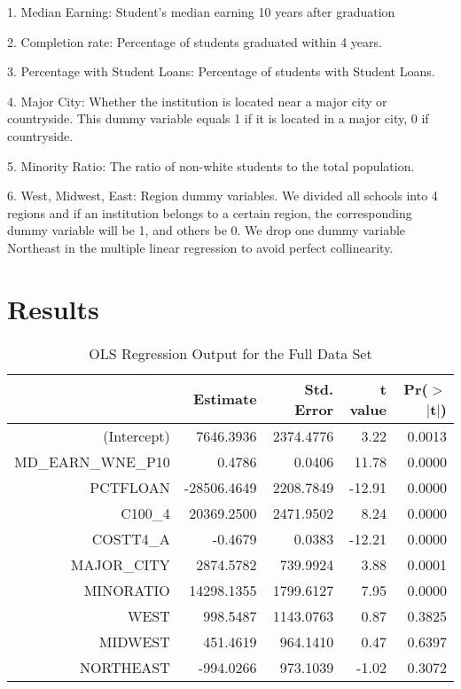 \documentclass{article}
\begin{document}
1. Median Earning: Student's median earning 10 years after graduation

2. Completion rate: Percentage of students graduated within 4 years.

3. Percentage with Student Loans: Percentage of students with Student Loans.

4. Major City: Whether the institution is located near a major city or countryside. This dummy variable equals 1 if it is located in a major city, 0 if countryside.

5. Minority Ratio: The ratio of non-white students to the total population.

6. West, Midwest, East: Region dummy variables. We divided all schools into 4 regions and if an institution belongs to a certain region, the corresponding dummy variable will be 1, and others be 0. We drop one dummy variable Northeast in the multiple linear regression to avoid perfect collinearity.

\section{Results}

\begin{Schunk}
\begin{Soutput}
\begin{table}[ht]
\centering
\begin{tabular}{rrrrr}
  \hline
 & Estimate & Std. Error & t value & Pr($>$$|$t$|$) \\ 
  \hline
(Intercept) & 7646.3936 & 2374.4776 & 3.22 & 0.0013 \\ 
  MD\_EARN\_WNE\_P10 & 0.4786 & 0.0406 & 11.78 & 0.0000 \\ 
  PCTFLOAN & -28506.4649 & 2208.7849 & -12.91 & 0.0000 \\ 
  C100\_4 & 20369.2500 & 2471.9502 & 8.24 & 0.0000 \\ 
  COSTT4\_A & -0.4679 & 0.0383 & -12.21 & 0.0000 \\ 
  MAJOR\_CITY & 2874.5782 & 739.9924 & 3.88 & 0.0001 \\ 
  MINORATIO & 14298.1355 & 1799.6127 & 7.95 & 0.0000 \\ 
  WEST & 998.5487 & 1143.0763 & 0.87 & 0.3825 \\ 
  MIDWEST & 451.4619 & 964.1410 & 0.47 & 0.6397 \\ 
  NORTHEAST & -994.0266 & 973.1039 & -1.02 & 0.3072 \\ 
   \hline
\end{tabular}
\caption{OLS Regression Output for the Full Data Set} 
\end{table}
\end{Soutput}
\end{Schunk}
  
\end{document}
